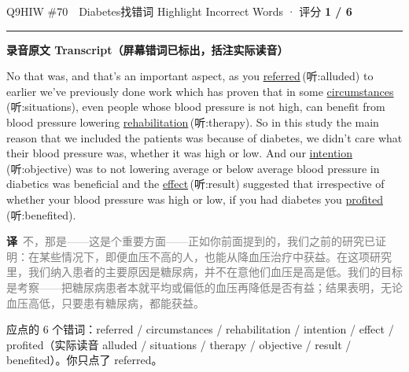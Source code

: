 \documentclass[11pt]{article}
\newcommand{\ptesub}[1]{%
  \par\needspace{2\baselineskip}\smallskip
  {\color{cAccent}\rule[-0.2ex]{3pt}{1.05em}}\hspace{6pt}%
  {\bfseries\color{cHead}#1}\par\nopagebreak\smallskip}
\newcommand{\zh}[1]{{\footnotesize\textcolor{cNote}{\textbf{译}}\ \textcolor{gray}{#1}}}
\newcommand{\hiw}[2]{{\color{cWrong}\uline{#1}}\,{\footnotesize\color{cFix}(听:#2)}} %
\begin{document}
\begin{qblock}{Q9\quad HIW \#70\ \ Diabetes}{找错词 Highlight Incorrect Words · 评分 \textcolor{cAccent}{\bfseries 1 / 6}}
\ptesub{录音原文 Transcript（屏幕错词已标出，括注实际读音）}
\begin{promptbox}
No that was, and that's an important aspect, as you \hiw{referred}{alluded} to earlier we've previously done work which has proven that in some \hiw{circumstances}{situations}, even people whose blood pressure is not high, can benefit from blood pressure lowering \hiw{rehabilitation}{therapy}. So in this study the main reason that we included the patients was because of diabetes, we didn't care what their blood pressure was, whether it was high or low. And our \hiw{intention}{objective} was to not lowering average or below average blood pressure in diabetics was beneficial and the \hiw{effect}{result} suggested that irrespective of whether your blood pressure was high or low, if you had diabetes you \hiw{profited}{benefited}.
\end{promptbox}
\zh{不，那是——这是个重要方面——正如你前面提到的，我们之前的研究已证明：在某些情况下，即便血压不高的人，也能从降血压治疗中获益。在这项研究里，我们纳入患者的主要原因是糖尿病，并不在意他们血压是高是低。我们的目标是考察——把糖尿病患者本就平均或偏低的血压再降低是否有益；结果表明，无论血压高低，只要患有糖尿病，都能获益。}
\par{\small 应点的 6 个错词：{\color{cWrong}referred / circumstances / rehabilitation / intention / effect / profited}\quad（实际读音 alluded / situations / therapy / objective / result / benefited）。\;你只点了 {\color{cWrong}referred}。}
\end{qblock}
\end{document}
